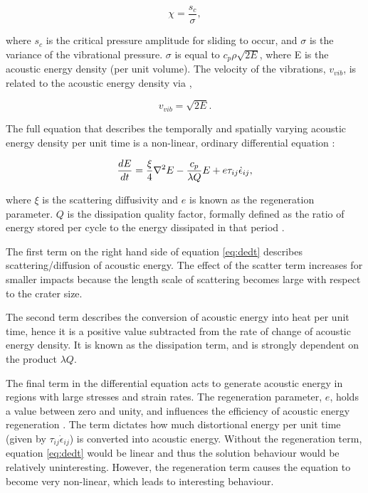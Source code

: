 \vspace{-0.2cm}
\begin{equation}\label{eq:chi}
\chi=\frac{s_{c}}{\sigma},
\end{equation}

where $s_{c}$ is the critical pressure amplitude for sliding to occur, and $\sigma$ is the variance of the vibrational pressure. $\sigma$ is equal to $c_{p} \rho \sqrt{2E}$, where E is the acoustic energy density (per unit volume). The velocity of the vibrations, $v_{vib}$, is related to the acoustic energy density via \citep{collins2002numerical},

\vspace{-0.2cm}
\begin{equation}\label{eq:velo}
v_{vib}=\sqrt{2E}.
\end{equation} 

The full equation that describes the temporally and spatially varying acoustic energy density per unit time is a non-linear, ordinary differential equation \citep{melosh1996dynamical}:

\begin{equation} \label{eq:dedt}
\frac{d E}{d t} = \frac{\xi}{4} \nabla^{2}E - \frac{c_{p}}{\lambda Q}E + e \tau_{ij} \dot{\epsilon}_{ij},\vspace{0.2cm}
\end{equation} 

where $\xi$ is the scattering diffusivity and $e$ is known as the regeneration parameter. $Q$ is the dissipation quality factor, formally defined as the  ratio of energy stored per cycle to the energy dissipated in that period \citep{collins2003acoustic,melosh1996dynamical}.

The first term on the right hand side of equation \ref{eq:dedt} describes scattering/diffusion of acoustic energy. The effect of the scatter term increases for smaller impacts because the length scale of scattering becomes large with respect to the crater size.
 
The second term describes the conversion of acoustic energy into heat per unit time, hence it is a positive value subtracted from the rate of change of acoustic energy density. It is known as the dissipation term, and is strongly dependent on the product $\lambda Q$. 

The final term in the differential equation acts to generate acoustic energy in regions with large stresses and strain rates. The regeneration parameter, $e$, holds a value between zero and unity, and influences the efficiency of acoustic energy regeneration \citep{melosh1996dynamical}. The term dictates how much distortional energy per unit time (given by $\tau_{ij} \dot{\epsilon}_{ij}$) is converted into acoustic energy.  Without the regeneration term, equation \ref{eq:dedt} would be linear and thus the solution behaviour would be relatively uninteresting. However, the regeneration term causes the equation to become very non-linear, which leads to interesting behaviour.


